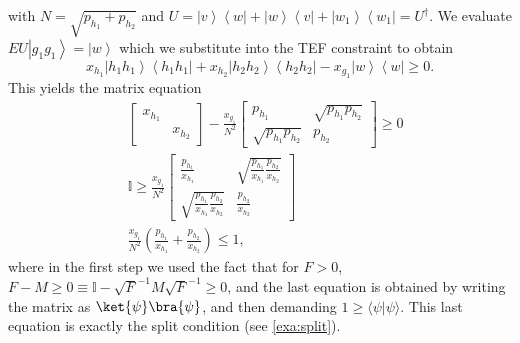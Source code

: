 \documentclass{article}
\begin{document}
\begin{itemize}
        with $N=\sqrt{p_{h_{1}}+p_{h_{2}}}$ and
        $
          U=\left|v\right\rangle \left\langle w\right|+\left|w\right\rangle \left\langle v\right|+\left|w_{1}\right\rangle \left\langle w_{1}\right|=U^{\dagger}.
        $
        We evaluate $EU\left|g_{1}g_{1}\right\rangle =\left|w\right\rangle $
        which we substitute into the TEF constraint to obtain
        \begin{displaymath}
          x_{h_{1}}\left|h_{1}h_{1}\right\rangle \left\langle h_{1}h_{1}\right|+x_{h_{2}}\left|h_{2}h_{2}\right\rangle \left\langle h_{2}h_{2}\right|-x_{g_{1}}\left|w\right\rangle \left\langle w\right|\ge0.
        \end{displaymath}
        This yields the matrix equation
        \begin{align*}
           & \left[\begin{array}{cc}
                       x_{h_{1}}    \\
                        & x_{h_{2}}
                     \end{array}\right]-\frac{x_{g_{1}}}{N^{2}}\left[\begin{array}{cc}
                                                                       p_{h_{1}}                 & \sqrt{p_{h_{1}}p_{h_{2}}} \\
                                                                       \sqrt{p_{h_{1}}p_{h_{2}}} & p_{h_{2}}
                                                                     \end{array}\right]  \ge0                                            \\
           & \mathbb{I}\ge \frac{x_{g_1}}{N^{2}}\left[\begin{array}{cc}
                                                          \frac{p_{h_1}}{x_{h_{1}} }                                  & \sqrt{\frac{p_{h_1}}{x_{h_{1}} }\frac{p_{h_2}}{x_{h_{2}} }} \\
                                                          \sqrt{\frac{p_{h_1}}{x_{h_{1}} }\frac{p_{h_2}}{x_{h_{2}} }} & \frac{p_{h_2}}{x_{h_{2}} }
                                                        \end{array}\right] \\
           & \frac{x_{g_{1}}}{N^{2}}\left(\frac{p_{h_{1}}}{x_{h_{1}}}+\frac{p_{h_{2}}}{x_{h_{2}}}\right)  \le 1,
        \end{align*}where in the first step we used the fact that for $F>0$, $F-M\ge 0 \equiv \mathbb{I}-\sqrt{F}^{-1}M\sqrt{F}^{-1}\ge 0$, and the last equation is obtained by writing the matrix as $\ket{\psi}\bra{\psi}$, and then demanding $1\ge\langle\psi|\psi\rangle$.
        This last equation is
        exactly the
        split condition (see \cref{exa:split}).
\end{itemize}
\end{document}
